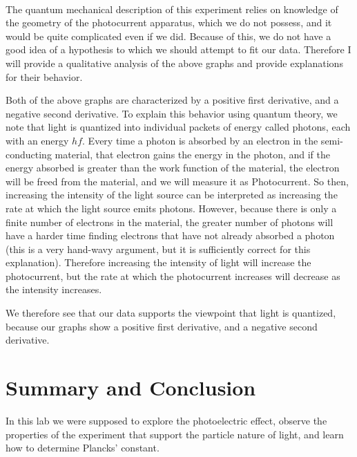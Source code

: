 \documentclass[11pt]{article}
\begin{document}
    \begin{center}
    \end{center}
    { \hspace*{\fill} \\}
    
    The quantum mechanical description of this experiment relies on
knowledge of the geometry of the photocurrent apparatus, which we do not
possess, and it would be quite complicated even if we did. Because of
this, we do not have a good idea of a hypothesis to which we should
attempt to fit our data. Therefore I will provide a qualitative analysis
of the above graphs and provide explanations for their behavior.

Both of the above graphs are characterized by a positive first
derivative, and a negative second derivative. To explain this behavior
using quantum theory, we note that light is quantized into individual
packets of energy called photons, each with an energy \(hf\). Every time
a photon is absorbed by an electron in the semi-conducting material,
that electron gains the energy in the photon, and if the energy absorbed
is greater than the work function of the material, the electron will be
freed from the material, and we will measure it as Photocurrent. So
then, increasing the intensity of the light source can be interpreted as
increasing the rate at which the light source emits photons. However,
because there is only a finite number of electrons in the material, the
greater number of photons will have a harder time finding electrons that
have not already absorbed a photon (this is a very hand-wavy argument,
but it is sufficiently correct for this explanation). Therefore
increasing the intensity of light will increase the photocurrent, but
the rate at which the photocurrent increases will decrease as the
intensity increases.

We therefore see that our data supports the viewpoint that light is
quantized, because our graphs show a positive first derivative, and a
negative second derivative.

    \hypertarget{summary-and-conclusion}{%
\section{Summary and Conclusion}\label{summary-and-conclusion}}

In this lab we were supposed to explore the photoelectric effect,
observe the properties of the experiment that support the particle
nature of light, and learn how to determine Plancks' constant.
\end{document}
